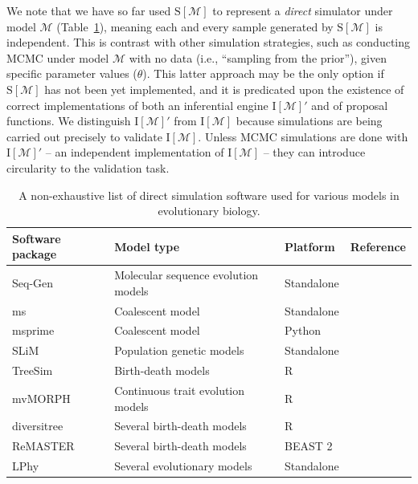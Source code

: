 \documentclass[oneside]{article}
\begin{document}
We note that we have so far used $\text{S}[\mathcal{M}]$ to represent a \emph{direct} simulator under model $\mathcal{M}$ (Table~\ref{tab:sim}), meaning each and every sample generated by $\text{S}[\mathcal{M}]$ is independent.
This is contrast with other simulation strategies, such as conducting MCMC under model $\mathcal{M}$ with no data (i.e., ``sampling from the prior''), given specific parameter values ($\theta$).
This latter approach may be the only option if $\text{S}[\mathcal{M}]$ has not been yet implemented, and it is predicated upon the existence of correct implementations of both an inferential engine $\text{I}[\mathcal{M}]'$ and of proposal functions.
We distinguish $\text{I}[\mathcal{M}]'$ from $\text{I}[\mathcal{M}]$ because simulations are being carried out precisely to validate $\text{I}[\mathcal{M}]$.
Unless MCMC simulations are done with $\text{I}[\mathcal{M}]'$ -- an independent implementation of $\text{I}[\mathcal{M}]$ -- they can introduce circularity to the validation task.

\begin{center}
  \begin{table}[h]
  \caption{A non-exhaustive list of direct simulation software used for various models in evolutionary biology.}
  \label{tab:sim}
  \centering
  \begin{tabular}{ p{0.7in} p{1.5in} p{1in} p{1.3in} }
    \hline
    Software package & Model type & Platform & Reference \\
    \hline  
    \rowcolor{gray!10}Seq-Gen & Molecular sequence evolution models & Standalone & \citealp{rambaut97} \\
    ms & Coalescent model & Standalone & \citealp{hudson02}\\
    \rowcolor{gray!10}msprime & Coalescent model & Python & \citealp{kelleher16}\\
    SLiM & Population genetic models & Standalone & \citealp{haller19}\\    
    \rowcolor{gray!10}TreeSim & Birth-death models & R & \citealp{stadler11}\\
    mvMORPH & Continuous trait evolution models & R & \citealp{clavel15}\\
    \rowcolor{gray!10}diversitree & Several birth-death models & R & \citealp{fitzjohn12}\\
    ReMASTER & Several birth-death models & BEAST 2 & \citealp{vaughan24}\\
    \rowcolor{gray!10}LPhy & Several evolutionary models & Standalone & \citealp{drummond23}\\ 
    \hline
  \end{tabular}
  \end{table}
\end{center}
\end{document}
